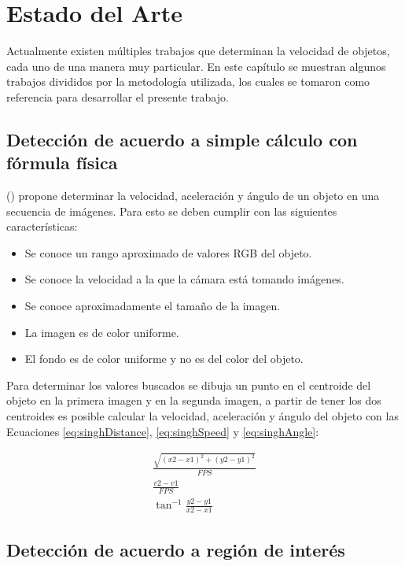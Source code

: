 \chapter{Estado del Arte}

Actualmente existen múltiples trabajos que determinan la velocidad de objetos, cada uno de una manera muy particular. En este capítulo se muestran algunos trabajos divididos por la metodología utilizada, los cuales se tomaron como referencia para desarrollar el presente trabajo. 
\section{Detección de acuerdo a simple cálculo con fórmula física }

\citeauthor{singh2007Estimating} (\cite{singh2007Estimating}) propone determinar la velocidad, aceleración y ángulo de un objeto en una secuencia de imágenes. Para esto se deben cumplir con las siguientes características: 

\begin{itemize} 
    \item Se conoce un rango aproximado de valores RGB del objeto. 
    \item Se conoce la velocidad a la que la cámara está tomando imágenes. 
    \item Se conoce aproximadamente el tamaño de la imagen. 
    \item La imagen es de color uniforme. 
    \item El fondo es de color uniforme y no es del color del objeto. 
\end{itemize} 

Para determinar los valores buscados se dibuja un punto en el centroide del objeto en la primera imagen y en la segunda imagen, a partir de tener los dos centroides es posible calcular la velocidad, aceleración y ángulo del objeto con las Ecuaciones \ref{eq:singhDistance}, \ref{eq:singhSpeed} y \ref{eq:singhAngle}: 

\begin{eqnarray}
    \label{eq:singhDistance}
    \frac{ 
        \sqrt{ 
            (x2-x1)^{2} + (y2-y1)^{2} 
        } 
    }{ 
        FPS 
    }\\ 
    \label{eq:singhSpeed}
    \frac{ 
        v2-v1 
    }{ 
        FPS 
    }\\ 
    \label{eq:singhAngle}
    \tan^{-1}\frac{y2-y1}{x2-x1} 
\end{eqnarray} 

\section{Detección de acuerdo a región de interés }

